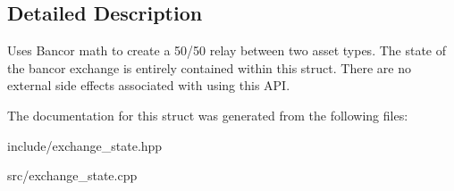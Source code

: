 \subsection{Detailed Description}
Uses Bancor math to create a 50/50 relay between two asset types. The state of the bancor exchange is entirely contained within this struct. There are no external side effects associated with using this A\+PI. 

The documentation for this struct was generated from the following files\+:\begin{DoxyCompactItemize}
\item 
include/exchange\+\_\+state.\+hpp\item 
src/exchange\+\_\+state.\+cpp\end{DoxyCompactItemize}
